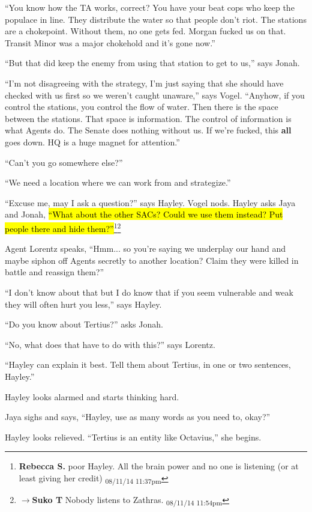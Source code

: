 ``You know how the TA works, correct?  You have your beat cops who keep the populace in line. They distribute the water so that people don't riot.  The stations are a chokepoint.  Without them, no one gets fed.  Morgan fucked us on that.  Transit Minor was a major chokehold and it's gone now.''

``But that did keep the enemy from using that station to get to us,'' says Jonah.

``I'm not disagreeing with the strategy, I'm just saying that she should have checked with us first so we weren't caught unaware,'' says Vogel.  ``Anyhow, if you control the stations, you control the flow of water.  Then there is the space between the stations.  That space is information.  The control of information is what Agents do.  The Senate does nothing without us. If we're fucked, this \textbf{all} goes down.  HQ is a huge magnet for attention.''

``Can't you go somewhere else?''

``We need a location where we can work from and strategize.''

``Excuse me, may I ask a question?'' says Hayley.  Vogel nods.  Hayley asks Jaya and Jonah, \hl{``What about the other SACs?  Could we use them instead?  Put people there and hide them?''}\footnote{\textbf{Rebecca S. }poor Hayley.  All the brain power and no one is listening (or at least giving her credit) \textsubscript{08/11/14 11:37pm}}\footnote{$\rightarrow$\textbf{Suko T }Nobody listens to Zathras. \textsubscript{08/11/14 11:54pm}}

Agent Lorentz speaks, ``Hmm... so you're saying we underplay our hand and maybe siphon off Agents secretly to another location?  Claim they were killed in battle and reassign them?''

``I don't know about that but I do know that if you seem vulnerable and weak they will often hurt you less,'' says Hayley.

``Do you know about Tertius?'' asks Jonah.

``No, what does that have to do with this?'' says Lorentz.

``Hayley can explain it best.  Tell them about Tertius, in one or two sentences, Hayley.''

Hayley looks alarmed and starts thinking hard.

Jaya sighs and says, ``Hayley, use as many words as you need to, okay?''

Hayley looks relieved.  ``Tertius is an entity like Octavius,'' she begins.

